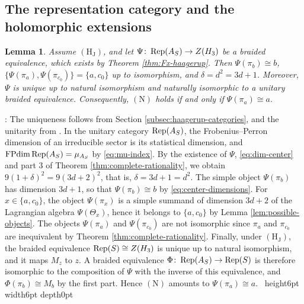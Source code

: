 \documentclass[leqno]{article}
\let\cal\relax
\newcommand{\cal}{\mathcal}
\newcommand{\qed}{\hfill \vrule height6pt  width6pt depth0pt}
\newcommand{\co}{\colon}
\DeclareMathOperator{\Rep}{Rep} %
\newtheorem{lemma}[thm]{Lemma}
\newenvironment{proof}[1][]{\noindent {\it Proof #1} : }{\hbox{~}\qed
\smallskip
}
\numberwithin{equation}{section}
\begin{document}
\subsection{The representation category and the holomorphic extensions}

\begin{lemma}
\label{lem:N0}
Assume $\mathrm{(H_J)}$, and let $\Psi \co \Rep(\cal A_S) \to Z(\cal H_3)$ be a braided equivalence, which exists by Theorem \ref{thm:Fx-haagerup}. Then $\Psi(\pi_b) \cong b$, $\{\Psi(\pi_a),\Psi(\pi_{c_0})\} = \{a,c_0\}$ up to isomorphism, and $\delta = d^2 = 3d+1$. Moreover, $\Psi$ is unique up to natural isomorphism and naturally isomorphic to a unitary braided equivalence. Consequently, $\mathrm{(N)}$ holds if and only if $\Psi(\pi_a) \cong a$.
\end{lemma}

\begin{proof}
The uniqueness follows from Section \ref{subsec:haagerup-categories}, and the unitarity from \cite[Theorem 5 p.~2]{Reu23}. In the unitary category $\Rep(\cal A_S)$, the Frobenius--Perron dimension of an irreducible sector is its statistical dimension, and $\operatorname{FPdim}\Rep(\cal A_S) = \mu_{\cal A_S}$ by \eqref{eq:mu-index}. By the existence of $\Psi$, \eqref{eq:dim-center} and part 3 of Theorem \ref{thm:complete-rationality}, we obtain $9(1+\delta)^2 = 9(3d+2)^2$, that is, $\delta = 3d+1 = d^2$. The simple object $\Psi(\pi_b)$ has dimension $3d+1$, so that $\Psi(\pi_b) \cong b$ by \eqref{eq:center-dimensions}. For $x \in \{a,c_0\}$, the object $\Psi(\pi_x)$ is a simple summand of dimension $3d+2$ of the Lagrangian algebra $\Psi(\Theta_x)$, hence it belongs to $\{a,c_0\}$ by Lemma \ref{lem:possible-objects}. The objects $\Psi(\pi_a)$ and $\Psi(\pi_{c_0})$ are not isomorphic since $\pi_a$ and $\pi_{c_0}$ are inequivalent by Theorem \ref{thm:complete-rationality}. Finally, under $\mathrm{(H_J)}$, the braided equivalence $\Rep(S) \cong Z(\cal H_3)$ is unique up to natural isomorphism, and it maps $M_z$ to $z$. A braided equivalence $\Phi \co \Rep(\cal A_S) \to \Rep(S)$ is therefore isomorphic to the composition of $\Psi$ with the inverse of this equivalence, and $\Phi(\pi_b) \cong M_b$ by the first part. Hence $\mathrm{(N)}$ amounts to $\Psi(\pi_a) \cong a$.
\end{proof}
\end{document}
